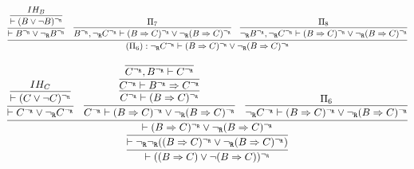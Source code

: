 \begin{enumerate}[(i)]
\begin{itemize}
            $$
            \infer{
                (\Pi_6) : \ngr C^\ngr \vdash (B \Rightarrow C)^\ngr \vee \ngr (B \Rightarrow C)^\ngr
            }{
                \infer{
                    \vdash B^\ngr \vee \ngr B^\ngr
                }{
                    \infer{
                        \vdash (B \vee \neg B)^\ngr
                    }{
                        IH_B
                    }
                }
                &
                \infer{
                    B^\ngr, \ngr C^\ngr \vdash (B \Rightarrow C)^\ngr \vee \ngr (B \Rightarrow C)^\ngr
                }{
                    \Pi_7
                }
                &
                \infer{
                    \ngr B^\ngr, \ngr C^\ngr \vdash (B \Rightarrow C)^\ngr \vee \ngr (B \Rightarrow C)^\ngr
                }{
                    \Pi_8
                }
            }  
            $$
            
            $$
            \infer{
                    \vdash ((B \Rightarrow C) \vee \neg (B \Rightarrow C))^\ngr
            }{
                \infer{
                    \vdash \ngr\ngr ((B \Rightarrow C)^\ngr \vee \ngr (B \Rightarrow C)^\ngr)
                }{
                    \infer{
                        \vdash (B \Rightarrow C)^\ngr \vee \ngr (B \Rightarrow C)^\ngr
                    }{
                        \infer{
                            \vdash C^\ngr \vee \ngr C^\ngr
                        }{
                            \infer{
                                \vdash (C \vee \neg C)^\ngr
                            }{
                                IH_C
                            }
                        }
                        &
                        \infer{
                            C^\ngr \vdash (B \Rightarrow C)^\ngr \vee \ngr (B \Rightarrow C)^\ngr
                        }{
                            \infer{
                                C^\ngr \vdash (B \Rightarrow C)^\ngr
                            }{
                                \infer{
                                    C^\ngr \vdash B^\ngr \Rightarrow C^\ngr
                                }{
                                    \infer{
                                        C^\ngr, B^\ngr \vdash C^\ngr
                                    }{
                                    }
                                }
                            }
                        }
                        &
                        \infer{
                            \ngr C^\ngr \vdash (B \Rightarrow C)^\ngr \vee \ngr (B \Rightarrow C)^\ngr
                        }{
                            \Pi_6
                        }
                    }
                }
            }
            $$


\end{itemize}
\end{enumerate}
